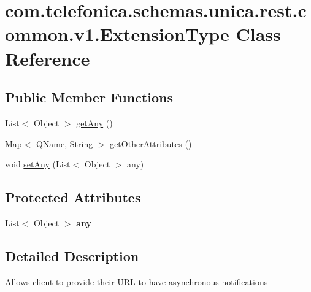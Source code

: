 \hypertarget{classcom_1_1telefonica_1_1schemas_1_1unica_1_1rest_1_1common_1_1v1_1_1ExtensionType}{
\section{com.telefonica.schemas.unica.rest.common.v1.ExtensionType Class Reference}
\label{classcom_1_1telefonica_1_1schemas_1_1unica_1_1rest_1_1common_1_1v1_1_1ExtensionType}
}
\subsection*{Public Member Functions}
\begin{DoxyCompactItemize}
\item 
List$<$ Object $>$ \hyperlink{classcom_1_1telefonica_1_1schemas_1_1unica_1_1rest_1_1common_1_1v1_1_1ExtensionType_af11ccea4e5baf37a3c78f32348a2c2b4}{getAny} ()
\item 
Map$<$ QName, String $>$ \hyperlink{classcom_1_1telefonica_1_1schemas_1_1unica_1_1rest_1_1common_1_1v1_1_1ExtensionType_a217d056537d1d145c1a48c5cbfd7869b}{getOtherAttributes} ()
\item 
void \hyperlink{classcom_1_1telefonica_1_1schemas_1_1unica_1_1rest_1_1common_1_1v1_1_1ExtensionType_a7320e861e969dc86508c6e291155cdcb}{setAny} (List$<$ Object $>$ any)
\end{DoxyCompactItemize}
\subsection*{Protected Attributes}
\begin{DoxyCompactItemize}
\item 
\hypertarget{classcom_1_1telefonica_1_1schemas_1_1unica_1_1rest_1_1common_1_1v1_1_1ExtensionType_a096b372d8ac17850a9fe0fbe5e3daa65}{
List$<$ Object $>$ {\bfseries any}}
\label{classcom_1_1telefonica_1_1schemas_1_1unica_1_1rest_1_1common_1_1v1_1_1ExtensionType_a096b372d8ac17850a9fe0fbe5e3daa65}

\end{DoxyCompactItemize}


\subsection{Detailed Description}
Allows client to provide their URL to have asynchronous notifications

